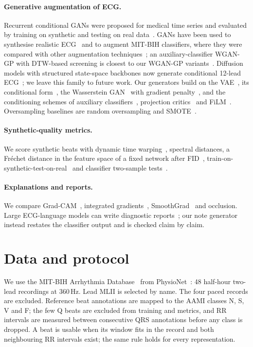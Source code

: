 \documentclass[11pt]{article}
\begin{document}
\paragraph{Generative augmentation of ECG.} Recurrent conditional GANs were proposed for medical time
series and evaluated by training on synthetic and testing on real data~\cite{esteban2017rcgan}. GANs have
been used to synthesise realistic ECG~\cite{delaney2019ecggan} and to augment MIT-BIH classifiers, where they were
compared with other augmentation techniques~\cite{shaker2020gan}; an auxiliary-classifier WGAN-GP with DTW-based screening is
closest to our WGAN-GP variants~\cite{adib2022cgan}. Diffusion models with structured state-space backbones
now generate conditional 12-lead ECG~\cite{alcaraz2023sssd}; we leave this family to future work. Our
generators build on the VAE~\cite{kingma2013vae}, its conditional form~\cite{sohn2015cvae}, the Wasserstein
GAN~\cite{arjovsky2017wgan} with gradient penalty~\cite{gulrajani2017wgangp}, and the conditioning schemes of
auxiliary classifiers~\cite{odena2016acgan}, projection critics~\cite{miyato2018projection} and
FiLM~\cite{perez2018film}. Oversampling baselines are random oversampling and SMOTE~\cite{chawla2002smote}.

\paragraph{Synthetic-quality metrics.} We score synthetic beats with dynamic time warping~\cite{sakoe1978dtw},
spectral distances, a Fr\'echet distance in the feature space of a fixed network after
FID~\cite{heusel2017fid}, train-on-synthetic-test-on-real~\cite{esteban2017rcgan} and classifier two-sample
tests~\cite{lopezpaz2017c2st}.

\paragraph{Explanations and reports.} We compare Grad-CAM~\cite{selvaraju2016gradcam}, integrated
gradients~\cite{sundararajan2017ig}, SmoothGrad~\cite{smilkov2017smoothgrad} and occlusion. Large ECG-language
models can write diagnostic reports~\cite{zhao2024ecgchat}; our note generator instead restates the classifier
output and is checked claim by claim.

\section{Data and protocol}
We use the MIT-BIH Arrhythmia Database~\cite{moody2001} from PhysioNet~\cite{goldberger2000}: 48 half-hour
two-lead recordings at 360\,Hz. Lead MLII is selected by name. The four paced records are excluded. Reference
beat annotations are mapped to the AAMI classes N, S, V and F; the few Q beats are excluded from training and
metrics, and RR intervals are measured between consecutive QRS annotations before any class is dropped. A beat
is usable when its window fits in the record and both neighbouring RR intervals exist; the same rule holds for
every representation.
\end{document}
